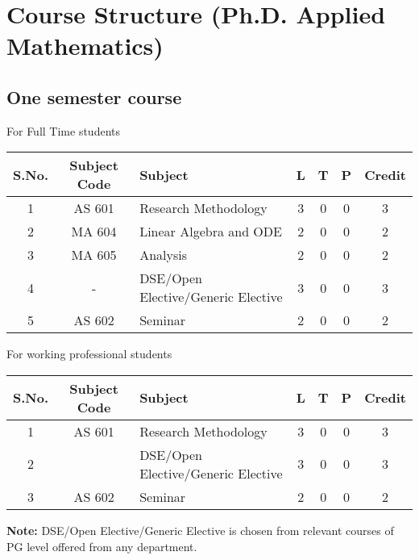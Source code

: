 \section{\normalsize Course Structure (Ph.D. Applied Mathematics)}

\subsection*{One semester course}  		

For Full Time students

\begin{center}
\begin{tabular}{| c |c |p{2.7in} |c|c|c|c|}
		\hline
		\hline
		\textbf{S.No.} & \textbf{Subject Code} & \textbf{Subject} & \textbf{L} & \textbf{T} & \textbf{P} & \textbf{Credit}  \\
			\hline
			\hline
			1 & AS 601  & Research Methodology & 3 & 0 & 0 & 3 \\
			\hline
		  2	& MA 604   & Linear Algebra and ODE 	&	2 & 0 & 0 & 2\\
			\hline
			3	& MA 605   & Analysis 	&	2 & 0 & 0 & 2\\
			\hline
			4	&  -  & DSE/Open Elective/Generic Elective 	&	3 & 0 & 0 & 3\\
			\hline
		 5 & AS 602 & Seminar	& 2 & 0 & 0 & 2 \\
			\hline
\end{tabular}
\end{center}

\vspace{1cm}


For working professional students

\begin{center}
\begin{tabular}{| c |c |p{2.7in} |c|c|c|c|}
		\hline
		\hline
		\textbf{S.No.} & \textbf{Subject Code} & \textbf{Subject} & \textbf{L} & \textbf{T} & \textbf{P} & \textbf{Credit}  \\
			\hline
			\hline
			1 & AS 601  & Research Methodology & 3 & 0 & 0 & 3 \\
			\hline
		  2	&    & DSE/Open Elective/Generic Elective 	&	3 & 0 & 0 & 3\\
			\hline
		 3 & AS 602 & Seminar	& 2 & 0 & 0 & 2 \\
			\hline
\end{tabular}
\end{center}

\textbf{Note:} DSE/Open Elective/Generic Elective is chosen from relevant courses of PG level offered from any department.